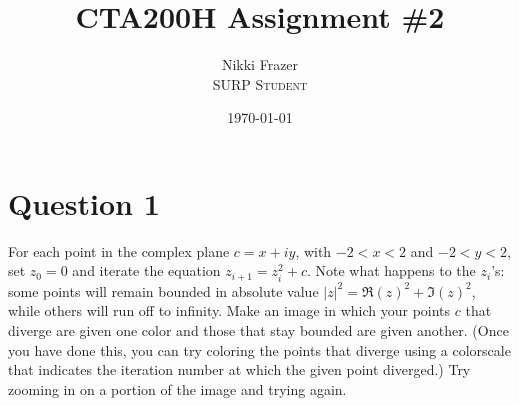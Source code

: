 \documentclass[12pt]{article}
\title{CTA200H Assignment \#2} %
\author{Nikki Frazer\\ %
\textsc{SURP Student}
}
\date{\today} %
\begin{document}
\setlength{\droptitle}{-5em}    
\maketitle


\section*{Question 1}


For each point in the complex plane $c = x + iy$, with $-2 < x < 2$ and $-2 < y < 2$, set $z_0 = 0$ and iterate the equation $z_{i + 1} = z_i^2 + c$. 
Note what happens to the $z_i$'s: some points will remain bounded in absolute value $|z|^2 = \Re(z)^2 + \Im(z)^2$, while others will run off to infinity. 
Make an image  in which your points $c$ that diverge are given one color and those that stay bounded are given another.
(Once you have done this, you can try coloring the points that diverge using a colorscale that indicates the iteration number at which the given point diverged.) 
Try zooming in on a portion of the image and trying again.

\end{document}
